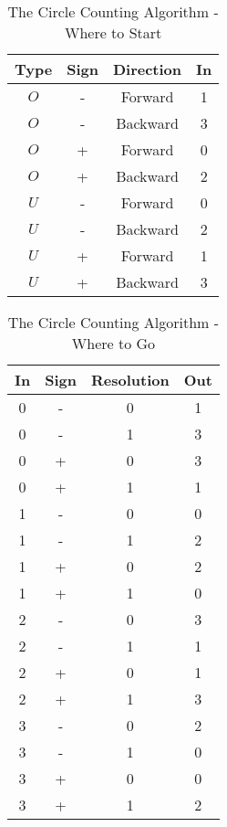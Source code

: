 \documentclass{article}
\theoremstyle{plain}
\begin{document}
        \begin{table}
            \centering
            \begin{tabular}{c c c c}
                Type&Sign&Direction&In\\
                \hline
                $O$&-&Forward&1\\
                $O$&-&Backward&3\\
                $O$&+&Forward&0\\
                $O$&+&Backward&2\\
                \hline
                $U$&-&Forward&0\\
                $U$&-&Backward&2\\
                $U$&+&Forward&1\\
                $U$&+&Backward&3
            \end{tabular}
            \caption{The Circle Counting Algorithm - Where to Start}
            \label{tab:circle_counting_algorithm_where_start}
        \end{table}
        \begin{table}
            \centering
            \begin{tabular}{c c c c}
                In&Sign&Resolution&Out\\
                \hline
                0&-&0&1\\
                0&-&1&3\\
                0&+&0&3\\
                0&+&1&1\\
                \hline
                1&-&0&0\\
                1&-&1&2\\
                1&+&0&2\\
                1&+&1&0\\
                \hline
                2&-&0&3\\
                2&-&1&1\\
                2&+&0&1\\
                2&+&1&3\\
                \hline
                3&-&0&2\\
                3&-&1&0\\
                3&+&0&0\\
                3&+&1&2
            \end{tabular}
            \caption{The Circle Counting Algorithm - Where to Go}
            \label{tab:circle_counting_algorithm_where_go}
        \end{table}
\end{document}
